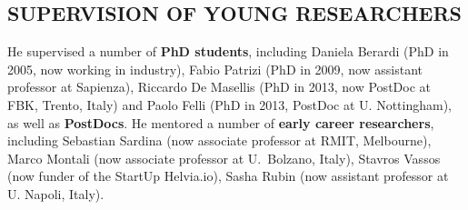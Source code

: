 \vspace{-1ex}
\subsection*{SUPERVISION OF YOUNG RESEARCHERS}
\vspace{-1ex}
He supervised a number of \textbf{PhD students}, including Daniela Berardi (PhD in 2005, now working in industry), Fabio Patrizi (PhD in 2009, now assistant professor at Sapienza), Riccardo De Masellis (PhD in 2013, now PostDoc at FBK, Trento, Italy) and Paolo Felli (PhD in 2013, PostDoc at U. Nottingham), as well as 
\textbf{PostDocs}. %
He mentored a number of \textbf{early career researchers}, including Sebastian Sardina (now associate professor at RMIT, Melbourne), Marco Montali (now associate professor at U.\ Bolzano, Italy), Stavros Vassos (now funder of the StartUp Helvia.io), Sasha Rubin (now assistant professor at U. Napoli, Italy).


\vspace{-1ex}
